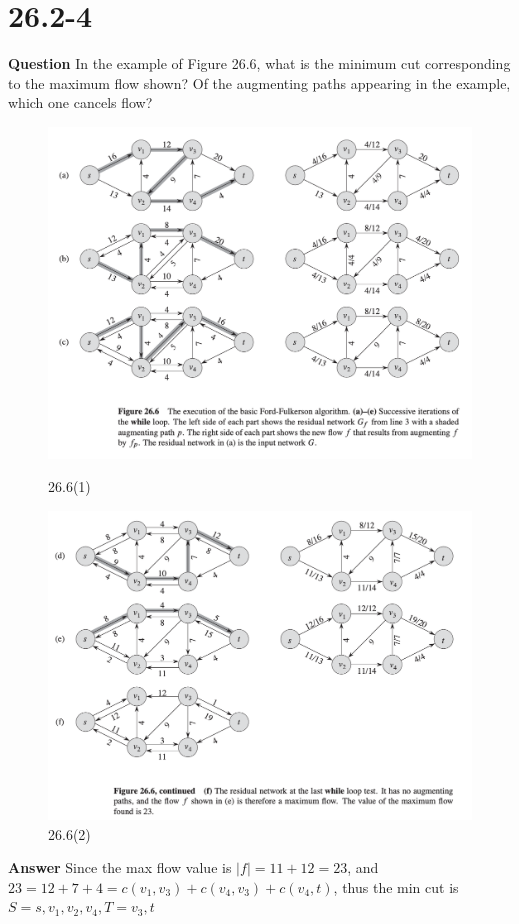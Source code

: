 \documentclass[12pt]{article}
\begin{document}
\section{26.2-4}
\textbf{Question}
In the example of Figure 26.6, what is the minimum cut corresponding to the maximum flow shown? Of the augmenting paths appearing in the example, which one cancels flow?
\begin{figure}[htbp]
    \begin{minipage}[t]{0.5\linewidth}
    \centering
    \includegraphics[width=0.8\linewidth]{26.6.1.png}
    \caption{26.6(1)}
    \label{fig:26.6(1)}
    \end{minipage}%
    \begin{minipage}[t]{0.5\linewidth}
    \centering
    \includegraphics[width=0.8\linewidth]{26.6.2.png}
    \caption{26.6(2)}
    \label{fig:26.6(2)}
        \end{minipage}%
\end{figure}


\textbf{Answer}
Since the max flow value is $|f| = 11+12 = 23$, and $23 = 12 + 7 + 4 = c(v_1,v_3) + c(v_4,v_3) + c(v_4,t)$, thus the min cut is $S={s,v_1,v_2,v_4}, T={v_3,t}$
\end{document}
